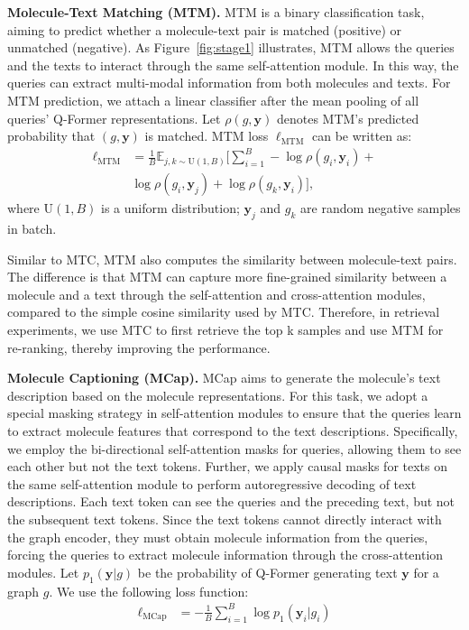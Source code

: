 \documentclass[11pt]{article}
\newcommand{\Vtr}[1]{\boldsymbol{#1}}
\begin{document}
\textbf{Molecule-Text Matching (MTM).} MTM is a binary classification task, aiming to predict whether a molecule-text pair is matched (positive) or unmatched (negative). As Figure~\ref{fig:stage1} illustrates, MTM allows the queries and the texts to interact through the same self-attention module. In this way, the queries can extract multi-modal information from both molecules and texts. For MTM prediction, we attach a linear classifier after the mean pooling of all queries' Q-Former representations. Let $\rho(g, \Vtr{y})$ denotes MTM's predicted probability that $(g, \Vtr{y})$ is matched. MTM loss $\ell_{\text{MTM}}$ can be written as:
\begin{align}
 \nonumber \ell_{\text{MTM}} & = \frac{1}{B} \mathbb{E}_{j, k\sim \text{U}(1,B)} \big[
 \sum_{i=1}^B -\log \rho(g_i, \Vtr{y}_i) + \\
 & \log \rho(g_i, \Vtr{y}_{j}) + \log \rho(g_{k}, \Vtr{y}_i)\big],
\end{align}
where $\text{U}(1,B)$ is a uniform distribution; $\Vtr{y}_{j}$ and $g_{k}$ are random negative samples in batch.

Similar to MTC, MTM also computes the similarity between molecule-text pairs. The difference is that MTM can capture more fine-grained similarity between a molecule and a text through the self-attention and cross-attention modules, compared to the simple cosine similarity used by MTC. Therefore, in retrieval experiments, we use MTC to first retrieve the top k samples and use MTM for re-ranking, thereby improving the performance.


\textbf{Molecule Captioning (MCap).} MCap aims to generate the molecule's text description based on the molecule representations. For this task, we adopt a special masking strategy in self-attention modules to ensure that the queries learn to extract molecule features that correspond to the text descriptions. Specifically, we employ the bi-directional self-attention masks for queries, allowing them to see each other but not the text tokens. Further, we apply causal masks for texts on the same self-attention module to perform autoregressive decoding of text descriptions. Each text token can see the queries and the preceding text, but not the subsequent text tokens. Since the text tokens cannot directly interact with the graph encoder, they must obtain molecule information from the queries, forcing the queries to extract molecule information through the cross-attention modules. Let $p_1(\Vtr{y}| g)$ be the probability of Q-Former generating text $\Vtr{y}$ for a graph $g$. We use the following loss function:
\begin{align}
 \ell_{\text{MCap}} & = -\frac{1}{B}\sum_{i=1}^{B}\log p_1(\Vtr{y}_i| g_i)
\end{align}
\end{document}
